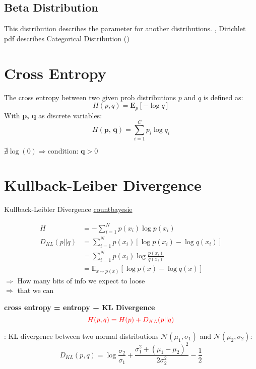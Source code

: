 \subsection{Beta Distribution}
This distribution describes the parameter for another distributions. \Eg, Dirichlet \ac{pdf} describes Categorical Distribution ()

\section{Cross Entropy}
\label{sec:cross-entropy}
The cross entropy between two given \ac{prob} distributions $p$ and $q$ is defined as:
\begin{equation}
	H(p, q) = \textbf{E}_p[-\log q]
\end{equation}
With \textbf{p, q} as discrete variables:
\begin{equation}
	H(\textbf{p, q}) = \sum_{i=1}^{C} p_i \log q_i
\end{equation}

\note $\nexists \log (0) \Rightarrow \text{condition: } \textbf{q} >0$

\section{Kullback-Leiber Divergence}

Kullback-Leibler Divergence	\href{https://www.countbayesie.com/blog/2017/5/9/kullback-leibler-divergence-explained}{countbayesie}

\begin{align}
	H &= - \sum_{i=1}^{N} p(x_i) \log p(x_i)\\
	D_{KL}(p || q) &= \sum_{i=1}^N p(x_i) \left[ \log p(x_i) - \log q(x_i) \right]\\
	&= \sum_{i=1}^N p(x_i) \log \frac{p(x_i)}{q(x_i)}\\
	&= \mathbb{E}_{x \sim p(x)} \left[ \log p(x) - \log q(x) \right]
\end{align}
$\Rightarrow$ How many bits of info we expect to loose\\
$\Rightarrow$  that we can 

\textbf{\color{red} cross entropy = entropy + KL Divergence}
\begin{equation}
	{\color{red} H(p, q) = H(p) + D_{KL}(p || q)}
\end{equation}

\Eg: KL divergence between two normal distributions $\mathcal{N}(\mu_1, \sigma_1)$ and $\mathcal{N}(\mu_2, \sigma_2)$:
\begin{equation}
	D_{KL}(p, q) = \log \frac{\sigma_2}{\sigma_1} + \frac{\sigma_1^2 + (\mu_1 - \mu_2)^2}{2 \sigma_2^2} - \frac{1}{2}
\end{equation}

